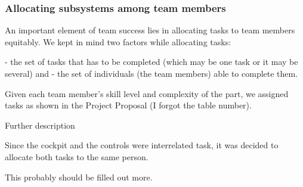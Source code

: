 \subsubsection{Allocating subsystems among team members}

An important element of team success lies in allocating tasks to team members equitably. We kept in mind two factors while allocating tasks:

  - the set of tasks that has to be completed (which may be one task or it may be several) and
  - the set of individuals (the team members) able to complete them.

Given each team member's skill level and complexity of the part, we assigned tasks as shown in the Project Proposal (I forgot the table number).

Further description

Since the cockpit and the controls were interrelated task, it was decided to allocate both tasks to the same person.

This probably should be filled out more.
